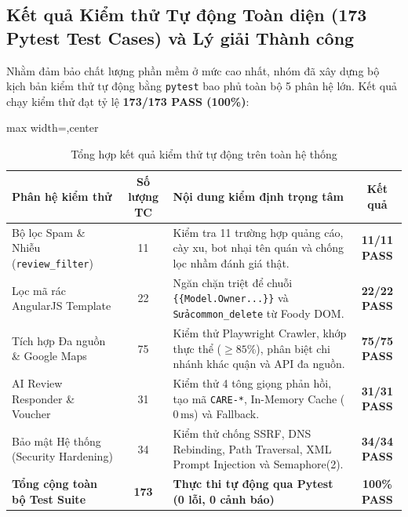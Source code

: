 \documentclass[12pt, a4paper]{article}
\begin{document}
\newpage
\subsection{Kết quả Kiểm thử Tự động Toàn diện (173 Pytest Test Cases) và Lý giải Thành công}
Nhằm đảm bảo chất lượng phần mềm ở mức cao nhất, nhóm đã xây dựng bộ kịch bản kiểm thử tự động bằng \texttt{pytest} bao phủ toàn bộ 5 phân hệ lớn. Kết quả chạy kiểm thử đạt tỷ lệ \textbf{173/173 PASS (100\%)}:

\begin{table}[!htbp]
\centering
\caption{Tổng hợp kết quả kiểm thử tự động trên toàn hệ thống}
\vspace{0.10cm}
\footnotesize
\renewcommand{\arraystretch}{1.03}
\begin{adjustbox}{max width=\textwidth,center}
\begin{tabularx}{0.97\textwidth}{l c X c}
\toprule
\rowcolor{blue!8}
\textbf{Phân hệ kiểm thử} & \textbf{Số lượng TC} & \textbf{Nội dung kiểm định trọng tâm} & \textbf{Kết quả} \\
\midrule
Bộ lọc Spam \& Nhiễu (\texttt{review\_filter}) & 11 & Kiểm tra 11 trường hợp quảng cáo, cày xu, bot nhại tên quán và chống lọc nhầm đánh giá thật. & \textbf{11/11 PASS} \\
\addlinespace[1.5pt]
Lọc mã rác AngularJS Template & 22 & Ngăn chặn triệt để chuỗi \texttt{\{\{Model.Owner...\}\}} và \texttt{Sửacommon\_delete} từ Foody DOM. & \textbf{22/22 PASS} \\
\addlinespace[1.5pt]
Tích hợp Đa nguồn \& Google Maps & 75 & Kiểm thử Playwright Crawler, khớp thực thể ($\ge 85\%$), phân biệt chi nhánh khác quận và API đa nguồn. & \textbf{75/75 PASS} \\
\addlinespace[1.5pt]
AI Review Responder \& Voucher & 31 & Kiểm thử 4 tông giọng phản hồi, tạo mã \texttt{CARE-*}, In-Memory Cache ($0\,\mathrm{ms}$) và Fallback. & \textbf{31/31 PASS} \\
\addlinespace[1.5pt]
Bảo mật Hệ thống (Security Hardening) & 34 & Kiểm thử chống SSRF, DNS Rebinding, Path Traversal, XML Prompt Injection và Semaphore(2). & \textbf{34/34 PASS} \\
\midrule
\rowcolor{blue!8}
\textbf{Tổng cộng toàn bộ Test Suite} & \textbf{173} & \textbf{Thực thi tự động qua Pytest (0 lỗi, 0 cảnh báo)} & \textbf{100\% PASS} \\
\bottomrule
\end{tabularx}
\end{adjustbox}
\end{table}
\end{document}

